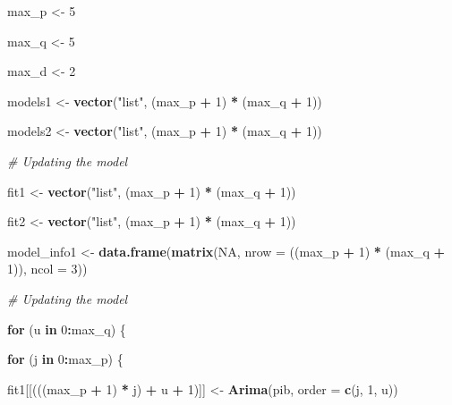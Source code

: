 \documentclass[
]{article}
\newenvironment{Shaded}{\begin{snugshade}}{\end{snugshade}}
\newcommand{\CommentTok}[1]{\textcolor[rgb]{0.56,0.35,0.01}{\textit{#1}}}
\newcommand{\ControlFlowTok}[1]{\textcolor[rgb]{0.13,0.29,0.53}{\textbf{#1}}}
\newcommand{\DataTypeTok}[1]{\textcolor[rgb]{0.13,0.29,0.53}{#1}}
\newcommand{\DecValTok}[1]{\textcolor[rgb]{0.00,0.00,0.81}{#1}}
\newcommand{\KeywordTok}[1]{\textcolor[rgb]{0.13,0.29,0.53}{\textbf{#1}}}
\newcommand{\NormalTok}[1]{#1}
\newcommand{\OperatorTok}[1]{\textcolor[rgb]{0.81,0.36,0.00}{\textbf{#1}}}
\newcommand{\OtherTok}[1]{\textcolor[rgb]{0.56,0.35,0.01}{#1}}
\newcommand{\StringTok}[1]{\textcolor[rgb]{0.31,0.60,0.02}{#1}}
\begin{document}
\begin{Shaded}
\begin{Highlighting}[]
\NormalTok{max_p <-}\StringTok{ }\DecValTok{5}

\NormalTok{max_q <-}\StringTok{ }\DecValTok{5}

\NormalTok{max_d <-}\StringTok{ }\DecValTok{2}

\NormalTok{models1 <-}\StringTok{ }\KeywordTok{vector}\NormalTok{(}\StringTok{"list"}\NormalTok{, (max_p }\OperatorTok{+}\StringTok{ }\DecValTok{1}\NormalTok{) }\OperatorTok{*}\StringTok{ }\NormalTok{(max_q }\OperatorTok{+}\StringTok{ }\DecValTok{1}\NormalTok{))}

\NormalTok{models2 <-}\StringTok{ }\KeywordTok{vector}\NormalTok{(}\StringTok{"list"}\NormalTok{, (max_p }\OperatorTok{+}\StringTok{ }\DecValTok{1}\NormalTok{) }\OperatorTok{*}\StringTok{ }\NormalTok{(max_q }\OperatorTok{+}\StringTok{ }\DecValTok{1}\NormalTok{))}

\CommentTok{# Updating the model}

\NormalTok{fit1 <-}\StringTok{ }\KeywordTok{vector}\NormalTok{(}\StringTok{"list"}\NormalTok{, (max_p }\OperatorTok{+}\StringTok{ }\DecValTok{1}\NormalTok{) }\OperatorTok{*}\StringTok{ }\NormalTok{(max_q }\OperatorTok{+}\StringTok{ }\DecValTok{1}\NormalTok{))}

\NormalTok{fit2 <-}\StringTok{ }\KeywordTok{vector}\NormalTok{(}\StringTok{"list"}\NormalTok{, (max_p }\OperatorTok{+}\StringTok{ }\DecValTok{1}\NormalTok{) }\OperatorTok{*}\StringTok{ }\NormalTok{(max_q }\OperatorTok{+}\StringTok{ }\DecValTok{1}\NormalTok{))}

\NormalTok{model_info1 <-}\StringTok{ }\KeywordTok{data.frame}\NormalTok{(}\KeywordTok{matrix}\NormalTok{(}\OtherTok{NA}\NormalTok{, }\DataTypeTok{nrow =}\NormalTok{ ((max_p }\OperatorTok{+}\StringTok{ }\DecValTok{1}\NormalTok{) }\OperatorTok{*}\StringTok{ }\NormalTok{(max_q }\OperatorTok{+}\StringTok{ }
\StringTok{    }\DecValTok{1}\NormalTok{)), }\DataTypeTok{ncol =} \DecValTok{3}\NormalTok{))}




\CommentTok{# Updating the model}

\ControlFlowTok{for}\NormalTok{ (u }\ControlFlowTok{in} \DecValTok{0}\OperatorTok{:}\NormalTok{max_q) \{}
    
    \ControlFlowTok{for}\NormalTok{ (j }\ControlFlowTok{in} \DecValTok{0}\OperatorTok{:}\NormalTok{max_p) \{}
        
        
\NormalTok{        fit1[[(((max_p }\OperatorTok{+}\StringTok{ }\DecValTok{1}\NormalTok{) }\OperatorTok{*}\StringTok{ }\NormalTok{j) }\OperatorTok{+}\StringTok{ }\NormalTok{u }\OperatorTok{+}\StringTok{ }\DecValTok{1}\NormalTok{)]] <-}\StringTok{ }\KeywordTok{Arima}\NormalTok{(pib, }\DataTypeTok{order =} \KeywordTok{c}\NormalTok{(j, }
            \DecValTok{1}\NormalTok{, u))}
        

\end{Highlighting}
\end{Shaded}
\end{document}
